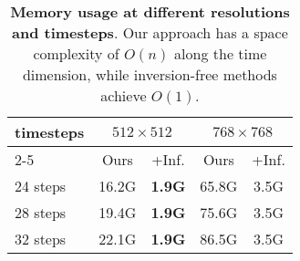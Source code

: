 \begin{table}[t]
    \begin{center} 
    \setlength{\tabcolsep}{4mm} %
    \begin{tabular}{l|cc|cc}
    \toprule
    \multirow{3}{*}[0.8ex]{timesteps} & \multicolumn{2}{c|}{$512 \times 512$} & \multicolumn{2}{c}{$768 \times 768$} \\
    \cmidrule(lr){2-5} & Ours & +Inf. & Ours & +Inf.\\
    \midrule
    24 steps & 16.2G& \textbf{1.9G} & 65.8G& 3.5G\\
    28 steps & 19.4G & \textbf{1.9G}& 75.6G & 3.5G\\
    32 steps & 22.1G& \textbf{1.9G} & 86.5G & 3.5G\\
    \bottomrule
    \end{tabular}
    \caption{\textbf{Memory usage at different resolutions and timesteps}. Our approach has a space complexity of $O(n)$ along the time dimension, while inversion-free methods achieve $O(1)$.}
    \label{tab:app_inf} 
    \end{center}
    \end{table}
